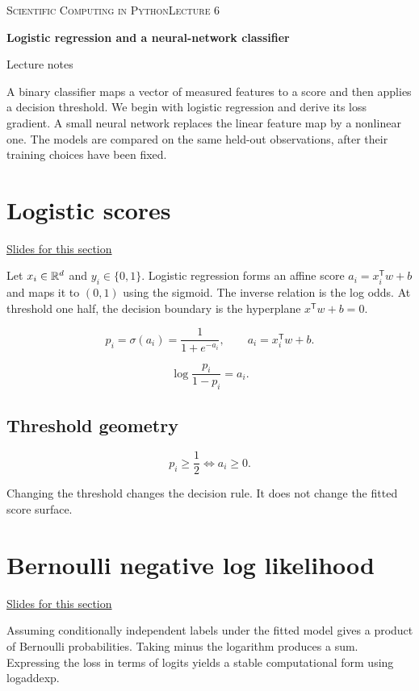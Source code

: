 \documentclass[11pt,letterpaper]{article}
\theoremstyle{definition}\newtheorem{definition}{Definition}\newtheorem{example}{Example}
\numberwithin{equation}{section}
\begin{document}
{\small\scshape Scientific Computing in Python\hfill Lecture 6}\par\medskip
{\raggedright{}\LARGE\bfseries\color{ink} Logistic regression and a neural-network classifier\par}\medskip
{\small Lecture notes}\par\bigskip
A binary classifier maps a vector of measured features to a score and then applies a decision threshold. We begin with logistic regression and derive its loss gradient. A small neural network replaces the linear feature map by a nonlinear one. The models are compared on the same held-out observations, after their training choices have been fixed.

\section{Logistic scores}
\hypertarget{note-logistic-scores}{}\label{note:logistic-scores}
{\small \href{slides.html\#frame=logistic-scores\&step=1}{Slides for this section}}\par
Let $x_i\in\mathbb{R}^d$ and $y_i\in\{0,1\}$. Logistic regression forms an affine score $a_i=x_i^{\mathsf T}w+b$ and maps it to $(0,1)$ using the sigmoid. The inverse relation is the log odds. At threshold one half, the decision boundary is the hyperplane $x^{\mathsf T}w+b=0$.

\[
p_i=\sigma(a_i)=\frac1{1+e^{-a_i}},\qquad a_i=x_i^{\mathsf T}w+b.
\]

\[
\log\frac{p_i}{1-p_i}=a_i.
\]

\subsection*{Threshold geometry}
\[
p_i\geq\frac12\iff a_i\geq0.
\]

Changing the threshold changes the decision rule. It does not change the fitted score surface.
\section{Bernoulli negative log likelihood}
\hypertarget{note-bernoulli-negative-log-likelihood}{}\label{note:bernoulli-negative-log-likelihood}
{\small \href{slides.html\#frame=bernoulli-negative-log-likelihood\&step=1}{Slides for this section}}\par
Assuming conditionally independent labels under the fitted model gives a product of Bernoulli probabilities. Taking minus the logarithm produces a sum. Expressing the loss in terms of logits yields a stable computational form using logaddexp.
\end{document}
